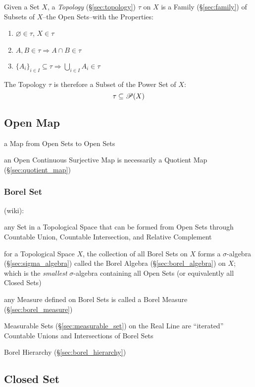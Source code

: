 Given a Set $X$, a \emph{Topology} (\S\ref{sec:topology}) $\tau$ on $X$ is a
Family (\S\ref{sec:family}) of Subsets of $X$--the Open Sets--with the
Properties:
\begin{enumerate}
  \item $\varnothing \in \tau$, $X \in \tau$
  \item $A,B \in \tau \Rightarrow A \cap B \in \tau$
  \item $\{A_i\}_{i \in I} \subseteq \tau \Rightarrow \bigcup_{i \in
  I} A_i \in \tau$
\end{enumerate}
The Topology $\tau$ is therefore a Subset of the Power Set of $X$:
\[
  \tau \subseteq \mathscr{P}(X)
\]



\subsection{Open Map}\label{sec:open_map}

a Map from Open Sets to Open Sets

an Open Continuous Surjective Map is necessarily a Quotient Map
(\S\ref{sec:quotient_map})



\subsubsection{Borel Set}\label{sec:borel_set}

(wiki):

any Set in a Topological Space that can be formed from Open Sets through
Countable Union, Countable Intersection, and Relative Complement

for a Topological Space $X$, the collection of all Borel Sets on $X$ forms a
$\sigma$-algebra (\S\ref{sec:sigma_algebra}) called the Borel Algebra
(\S\ref{sec:borel_algebra}) on $X$; which is the \emph{smallest}
$\sigma$-algebra containing all Open Sets (or equivalently all Closed Sets)

any Measure defined on Borel Sets is called a Borel Measure
(\S\ref{sec:borel_measure})

Measurable Sets (\S\ref{sec:measurable_set}) on the Real Line are ``iterated''
Countable Unions and Intersections of Borel Sets

\fist Borel Hierarchy (\S\ref{sec:borel_hierarchy})



\subsection{Closed Set}\label{sec:closed_set}

